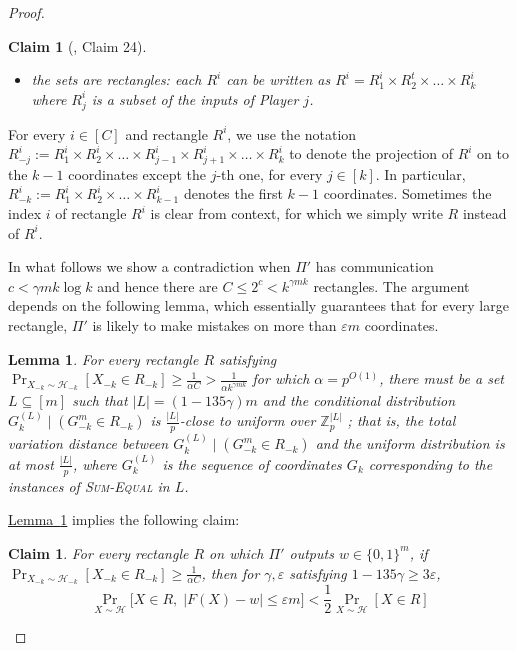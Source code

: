 \documentclass[11pt]{article}
\numberwithin{equation}{section}
\newtheorem{lemma}[theorem]{Lemma}
\newtheorem{claim}[theorem]{Claim}
\theoremstyle{definition}
\theoremstyle{plain}
\newcommand{\Z}{\mathbb Z}
\newcommand{\expref}[2]{\hyperref[#2]{#1~\ref{#2}}}
\newcommand{\cond}{\;|\;}
\newcommand{\zo}{\ensuremath{ \{ 0, 1 \} }}
\newcommand{\gap}{\ensuremath{\varepsilon}}
\newcommand{\bigo}[1]{\ensuremath{{{O} \left( {#1} \right)}}}
\newcommand{\eqdef}{\ensuremath{:=}}
\newcommand{\sumequal}{\textsc{Sum-Equal} }
\begin{document}
\begin{proof}
\begin{claim}[\cite{Viola:2013we}, Claim 24]
\begin{itemize}
				\item the sets are rectangles: each $R^i$ can be written as $R^i=R_1^i\times R_2^t\times\ldots\times R_k^i$ where $R_j^i$ is a subset of the inputs of Player $j$.
			\end{itemize}
		\end{claim} 

		For every $i\in [C]$ and rectangle $R^i$, we use the notation $R^i_{-j}\eqdef R^i_{1} \times R^i_{2} \times \dots \times R^i_{j-1}\times R^i_{j+1}\times \dots \times R^i_k$ to denote the projection of $R^i$ on to the $k-1$ coordinates except the $j$-th one, for every $j\in[k]$. 
		In particular, $R^i_{-k}\eqdef R^i_{1} \times R^i_{2} \times \dots \times R^i_{k-1}$ denotes the first $k-1$ coordinates.
		Sometimes the index $i$ of rectangle $R^i$ is clear from context, for which we simply write $R$ instead of $R^i$.

		In what follows we show a contradiction when $\Pi'$ has communication $c<\gamma mk\log k$ and hence there are $C\le 2^c<k^{\gamma m k}$ rectangles.
		The argument depends on the following lemma, which essentially guarantees that for every large rectangle, $\Pi'$ is likely to make mistakes on more than $\gap m$ coordinates.


		\begin{lemma}\label{lem: partial uniform}
			For every rectangle $R$ satisfying $\Pr_{X_{-k} \sim \mathcal{H}_{-k}}[X_{-k}\in R_{-k}]\ge \frac{1}{\alpha C}>\frac{1}{\alpha k^{\gamma mk}}$ for which $\alpha= p^{\bigo{1}}$,
			there must be a set $L\subseteq [m]$ such that $|L|=(1-135\gamma) m$ and {\color{black}the conditional distribution}
			$G_k^{(L)}\cond (G_{-k}^m \in R_{-k})$ is $\frac{|L|}{p}$-close to uniform over $\Z_p^{|L|}$ {\color{black} ; that is, the total variation distance between $G_k^{(L)}\cond (G_{-k}^m \in R_{-k})$ and the uniform distribution is at most $\frac{|L|}{p}$}, {\color{black} where $G_k^{(L)}$ is the sequence of coordinates $G_k$ corresponding to the instances of \sumequal in $L$.}
		\end{lemma}


		\expref{Lemma}{lem: partial uniform} implies the following claim:

		\begin{claim}\label{claim:ball}
			For every rectangle $R$ on which $\Pi'$ outputs $w\in \zo^m$,
			if $\Pr_{X_{-k} \sim \mathcal{H}_{-k}}\left[X_{-k}\in R_{-k}\right]\ge \frac{1}{\alpha C}$, 
			then for $\gamma,\gap$ satisfying $1-135\gamma \ge 3\gap$, 
			\begin{equation}\label{ineq:ball}
				  \Pr_{X \sim \mathcal{H}}\Big[ X\in R,\; \left|F(X)-w\right|\le \gap m \Big] 
				< \frac{1}{2} \Pr_{X \sim \mathcal{H}}\left[ X\in R\right]
			\end{equation} 	
		\end{claim} 


\end{proof}
\end{document}
